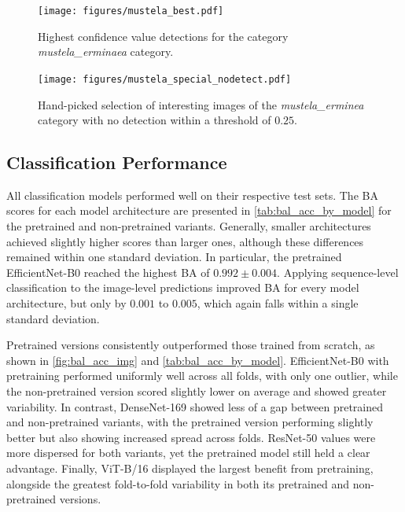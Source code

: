 

\begin{figure}[]
\centering
\texttt{[image: figures/mustela\_best.pdf]}
\caption{Highest confidence value detections for the category \textit{mustela\_erminaea} category.}
\label{fig:detection_mustela_best}
\end{figure}

\begin{figure}[]
\centering
\texttt{[image: figures/mustela\_special\_nodetect.pdf]}
\caption{Hand-picked selection of interesting images of the \textit{mustela\_erminea} category with no detection within a threshold of \(0.25\).}
\label{fig:detection_special_nodetect}
\end{figure}

\subsection{Classification Performance}
All classification models performed well on their respective test sets.
The \ac{BA} scores for each model architecture are presented in \autoref{tab:bal_acc_by_model} for the pretrained and non-pretrained variants.
Generally, smaller architectures achieved slightly higher scores than larger ones, although these differences remained within one standard deviation.
In particular, the pretrained EfficientNet-B0 reached the highest \ac{BA} of \(0.992\pm0.004\).
Applying sequence-level classification to the image-level predictions improved \ac{BA} for every model architecture, but only by \(0.001\) to \(0.005\), which again falls within a single standard deviation.

Pretrained versions consistently outperformed those trained from scratch, as shown in \autoref{fig:bal_acc_img} and \autoref{tab:bal_acc_by_model}.
EfficientNet-B0 with pretraining performed uniformly well across all folds, with only one outlier, while the non-pretrained version scored slightly lower on average and showed greater variability.
In contrast, DenseNet-169 showed less of a gap between pretrained and non-pretrained variants, with the pretrained version performing slightly better but also showing increased spread across folds.
ResNet-50 values were more dispersed for both variants, yet the pretrained model still held a clear advantage.
Finally, ViT-B/16 displayed the largest benefit from pretraining, alongside the greatest fold-to-fold variability in both its pretrained and non-pretrained versions.

